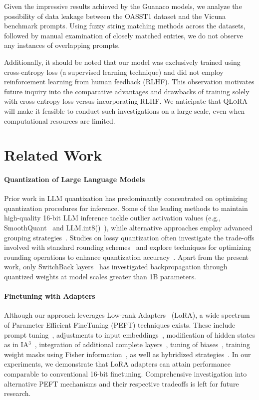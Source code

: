 Given the impressive results achieved by the {Guanaco} models, we analyze the possibility of data leakage between the OASST1 dataset and the Vicuna benchmark prompts. Using fuzzy string matching methods across the datasets, followed by manual examination of closely matched entries, we do not observe any instances of overlapping prompts.

Additionally, it should be noted that our model was exclusively trained using cross-entropy loss (a supervised learning technique) and did not employ reinforcement learning from human feedback (RLHF). This observation motivates future inquiry into the comparative advantages and drawbacks of training solely with cross-entropy loss versus incorporating RLHF. We anticipate that \textsc{QLoRA} will make it feasible to conduct such investigations on a large scale, even when computational resources are limited.

\section{Related Work}

\paragraph{Quantization of Large Language Models} Prior work in LLM quantization has predominantly concentrated on optimizing quantization procedures for inference. Some of the leading methods to maintain high-quality 16-bit LLM inference tackle outlier activation values (e.g., SmoothQuant~\citep{xiao2022smoothquant} and LLM.int8()~\citep{dettmers2022llm}), while alternative approaches employ advanced grouping strategies~\citep{park2022nuqmm, yao2022zeroquant}. Studies on lossy quantization often investigate the trade-offs involved with standard rounding schemes~\citep{dettmers2022case,zeng2022glm,pope2022efficiently} and explore techniques for optimizing rounding operations to enhance quantization accuracy~\citep{frantar2022gptq}. Apart from the present work, only SwitchBack layers~\citep{wortsman2023stable} has investigated backpropagation through quantized weights at model scales greater than 1B parameters.

\paragraph{Finetuning with Adapters} Although our approach leverages Low-rank Adapters~\citep{hu2021lora} (LoRA), a wide spectrum of Parameter Efficient FineTuning (PEFT) techniques exists. These include prompt tuning~\citep{qin2021learning,lester2021power,li2021prefix}, adjustments to input embeddings~\citep{an2022input}, modification of hidden states as in IA$^3$~\citep{liu2022few}, integration of additional complete layers~\citep{houlsby2019parameter}, tuning of biases~\citep{zaken2021bitfit}, training weight masks using Fisher information~\citep{sung2021training}, as well as hybridized strategies~\citep{henderson2021compacter}. In our experiments, we demonstrate that LoRA adapters can attain performance comparable to conventional 16-bit finetuning. Comprehensive investigation into alternative PEFT mechanisms and their respective tradeoffs is left for future research.

